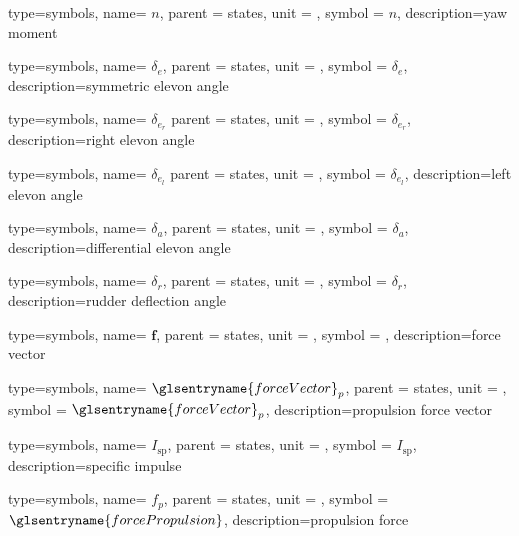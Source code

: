 {type=symbols,
  name= \ensuremath{n},
  parent = {states},
  unit = \unexpanded{\si{\newton\meter}},
  symbol = \ensuremath{n},
  description={yaw moment}
}

{type=symbols,
  name= \ensuremath{\delta_{e}},
  parent = {states},
  unit = \unexpanded{\si{\radian}},
  symbol = \ensuremath{\delta_{e}},
  description={symmetric elevon angle}
}

{type=symbols,
  name= \ensuremath{\delta_{e_{r}}}
  parent = {states},
  unit = \unexpanded{\si{\radian}},
  symbol = \ensuremath{\delta_{e_{r}}},
  description={right elevon angle}
}


{type=symbols,
  name= \ensuremath{\delta_{e_{l}}}
  parent = {states},
  unit = \unexpanded{\si{\radian}},
  symbol = \ensuremath{\delta_{e_{l}}},
  description={left elevon angle}
}



{type=symbols,
  name= \ensuremath{\delta_{a}},
  parent = {states},
  unit = \unexpanded{\si{\degree}},
  symbol = \ensuremath{\delta_{a}},
  description={differential elevon angle}
}

{type=symbols,
  name= \ensuremath{\delta_{r}},
  parent = {states},
  unit = \unexpanded{\si{\degree}},
  symbol = \ensuremath{\delta_{r}},
  description={rudder deflection angle}
}

{type=symbols,
  name= \ensuremath{\mathbf{f}},
  parent = {states},
  unit = \unexpanded{\si{\newton}},
  symbol = ,
  description={force vector}
}

{type=symbols,
  name= \ensuremath{{\glsentryname{forceVector}}_{p}},
  parent = {states},
  unit = \unexpanded{\si{\newton}},
  symbol = \ensuremath{{\glsentryname{forceVector}}_{p}},
  description={propulsion force vector}
}

{type=symbols,
  name= \ensuremath{I_\textrm{sp}},
  parent = {states},
  unit = \unexpanded{\si{\second}},
  symbol = \ensuremath{I_\textrm{sp}},
  description={specific impulse}
}


{type=symbols,
  name= \ensuremath{f_{p}},
  parent = {states},
  unit = \unexpanded{\si{\newton}},
  symbol = \ensuremath{\glsentryname{forcePropulsion}},
  description={propulsion force}
}


